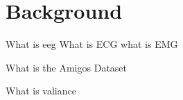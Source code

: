\section{Background}

What is eeg
What is ECG
what is EMG

What is the Amigos Dataset

What is valiance


